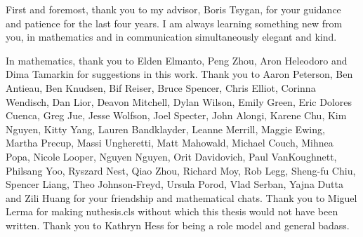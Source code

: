 First and foremost, thank you to my advisor, Boris Tsygan, for your guidance and patience for the last four years. I am always learning something new from you, in mathematics and in communication simultaneously elegant and kind. 

In mathematics, thank you to Elden Elmanto, Peng Zhou, Aron Heleodoro and Dima Tamarkin for suggestions in this work. Thank you to 
Aaron Peterson, 
Ben Antieau, 
Ben Knudsen, 
Bif Reiser, 
Bruce Spencer, 
Chris Elliot, 
Corinna Wendisch, 
Dan Lior, 
Deavon Mitchell, 
Dylan Wilson, 
Emily Green, 
Eric Dolores Cuenca, 
Greg Jue, 
Jesse Wolfson, 
Joel Specter, 
John Alongi, 
Karene Chu, 
Kim Nguyen, 
Kitty Yang, 
Lauren Bandklayder, 
Leanne Merrill, 
Maggie Ewing, 
Martha Precup, 
Massi Ungheretti, 
Matt Mahowald, 
Michael Couch, 
Mihnea Popa, 
Nicole Looper, 
Nguyen Nguyen, 
Orit Davidovich, 
Paul VanKoughnett, 
Philsang Yoo, 
Ryszard Nest, 
Qiao Zhou, 
Richard Moy, 
Rob Legg, 
Sheng-fu Chiu, 
Spencer Liang, 
Theo Johnson-Freyd, 
Ursula Porod, 
Vlad Serban, 
Yajna Dutta and 
Zili Huang for your friendship and mathematical chats. 
Thank you to Miguel Lerma for making nuthesis.cls without which this thesis would not have been written. 
Thank you to Kathryn Hess for being a role model and general badass.